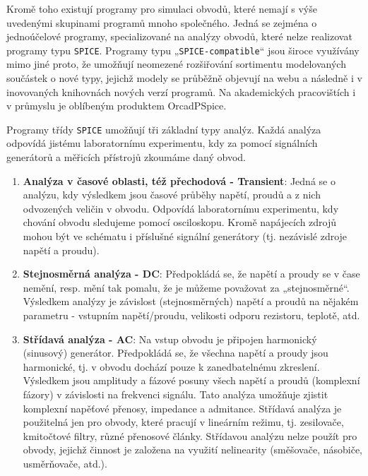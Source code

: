       Kromě toho existují programy pro simulaci obvodů, které nemají s výše uvedenými skupinami
      programů mnoho společného. Jedná se zejména o jednoúčelové programy, specializované na analýzy
      obvodů, které nelze realizovat programy typu \texttt{SPICE}. Programy typu
      „\texttt{SPICE-compatible}“ jsou široce využívány mimo jiné proto, že umožňují neomezené
      rozšiřování sortimentu modelovaných součástek o nové typy, jejichž modely se průběžně objevují
      na webu a následně i v inovovaných knihovnách nových verzí programů. Na akademických
      pracovištích i v průmyslu je oblíbeným produktem OrcadPSpice. \cite[s.~10]{Biolek2}

      Programy třídy \texttt{SPICE} umožňují tři základní typy analýz. Každá analýza odpovídá
      jistému laboratornímu experimentu, kdy za pomocí signálních generátorů a měřicích přístrojů
      zkoumáme daný obvod. 
      \begin{enumerate}[leftmargin=1cm,rightmargin=.1cm, label=\emph{\alph*}),noitemsep]
        \item \textbf{Analýza v časové oblasti, též přechodová - Transient}: Jedná se o analýzu, kdy
              výsledkem jsou časové průběhy napětí, proudů a z nich odvozených veličin v obvodu.
              Odpovídá laboratornímu experimentu, kdy chování obvodu sledujeme pomocí osciloskopu.
              Kromě napájecích zdrojů mohou být ve schématu i příslušné signální generátory (tj.
              nezávislé zdroje napětí a proudu). 
        \item \textbf{Stejnosměrná analýza - DC}: Předpokládá se, že napětí a proudy se v čase
              nemění, resp. mění tak pomalu, že je můžeme považovat za „stejnosměrné“. Výsledkem
              analýzy je závislost (stejnosměrných) napětí a proudů na nějakém parametru - vstupním
              napětí/proudu, velikosti odporu rezistoru, teplotě, atd. 
        \item \textbf{Střídavá analýza - AC}: Na vstup obvodu je připojen harmonický (sinusový)
              generátor. Předpokládá se, že všechna napětí a proudy jsou harmonické, tj. v obvodu
              dochází pouze k zanedbatelnému zkreslení. Výsledkem jsou amplitudy a fázové posuny
              všech napětí a proudů (komplexní fázory) v závislosti na frekvenci signálu. Tato
              analýza umožňuje zjistit komplexní napěťové přenosy, impedance a admitance. Střídavá
              analýza je použitelná jen pro obvody, které pracují v lineárním režimu, tj.
              zesilovače, kmitočtové filtry, různé přenosové články. Střídavou analýzu nelze použít
              pro obvody, jejichž činnost je založena na využití nelinearity (směšovače, násobiče,
              usměrňovače, atd.).
      \end{enumerate}

